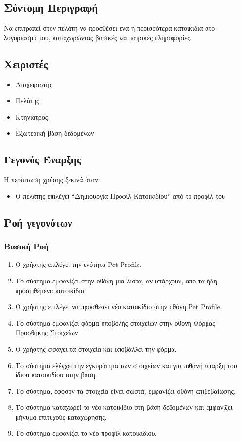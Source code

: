 \documentclass[12pt,a4paper,twoside]{book}
\begin{document}
\subsection{Σύντομη Περιγραφή}
Να επιτραπεί στον πελάτη να προσθέσει ένα ή περισσότερα κατοικίδια στο λογαριασμό του, καταχωρώντας βασικές και ιατρικές πληροφορίες. %

\subsection{Χειριστές}
\begin{itemize}
  \item Διαχειριστής
  \item Πελάτης
  \item Κτηνίατρος
  \item Εξωτερική βάση δεδομένων %
\end{itemize}

\subsection{Γεγονός Έναρξης}
Η περίπτωση χρήσης ξεκινά όταν:
\begin{itemize}
  \item Ο πελάτης επιλέγει “Δημιουργία Προφίλ Κατοικιδίου” από το προφίλ του   %
\end{itemize}

\subsection{Ροή γεγονότων}

\subsubsection{Βασική Ροή}
\begin{enumerate}
  \item Ο χρήστης επιλέγει την ενότητα Pet Profile. %
  \item Το σύστημα εμφανίζει στην οθόνη μια λίστα, αν υπάρχουν, απο τα ήδη προστιθέμενα κατοικίδια %
  \item Ο χρήστης επιλέγει να προσθέσει νέο κατοικίδιο στην οθόνη Pet Profile. %
  \item Το σύστημα εμφανίζει φόρμα υποβολής στοιχείων στην οθόνη Φόρμας Προσθήκης Στοιχείων  %
  \item Ο χρήστης  εισάγει τα στοιχεία και υποβάλλει την φόρμα. %
  \item Το σύστημα ελέγχει την εγκυρότητα των στοιχείων και για πιθανή ύπαρξη του ίδιου κατοικιδίου στην βάση. %
  \item Το σύστημα, εφόσον τα στοιχεία είναι σωστά, εμφανίζει οθόνη επιβεβαίωσης. %
  \item Το σύστημα καταχωρεί το νέο κατοικίδιο στη βάση δεδομένων και εμφανίζει μήνυμα επιτυχούς καταχώρησης. %
  \item Το σύστημα εμφανίζει το νέο προφίλ κατοικιδίου. %
\end{enumerate}
\end{document}
